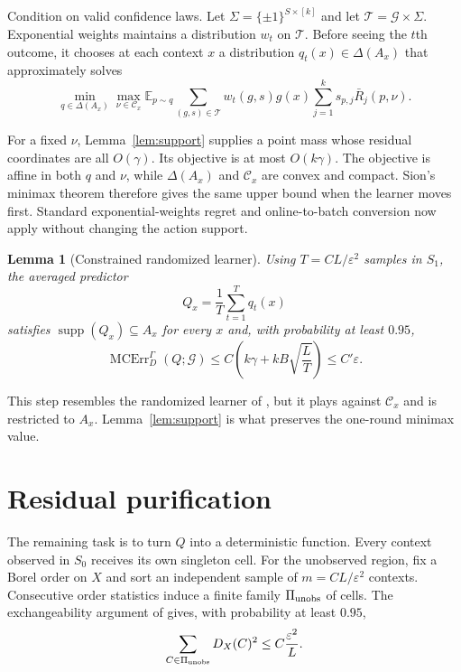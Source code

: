 \documentclass{article}
\newtheorem{lemma}[theorem]{Lemma}
\theoremstyle{definition}
\theoremstyle{remark}
\newcommand{\E}{\mathbb E}
\newcommand{\1}{\mathbf 1}
\newcommand{\cG}{\mathcal G}
\newcommand{\cC}{\mathcal C}
\newcommand{\simplex}{\Delta}
\newcommand{\MCE}{\operatorname{MCErr}}
\newcommand{\supp}{\operatorname{supp}}
\begin{document}
Condition on valid confidence laws. Let $\Sigma=\{\pm1\}^{S\times[k]}$ and let $\mathcal T=\cG\times\Sigma$. Exponential weights maintains a distribution $w_t$ on $\mathcal T$. Before seeing the $t$th outcome, it chooses at each context $x$ a distribution $q_t(x)\in\simplex(A_x)$ that approximately solves
\begin{equation}
\min_{q\in\simplex(A_x)}\max_{\nu\in\cC_x}
\E_{p\sim q}\sum_{(g,s)\in\mathcal T}w_t(g,s)g(x)\sum_{j=1}^k s_{p,j}\bar R_j(p,\nu).
\label{eq:minimax}
\end{equation}

For a fixed $\nu$, Lemma~\ref{lem:support} supplies a point mass whose residual coordinates are all $O(\gamma)$. Its objective is at most $O(k\gamma)$. The objective is affine in both $q$ and $\nu$, while $\simplex(A_x)$ and $\cC_x$ are convex and compact. Sion's minimax theorem \citep{sion1958minimax} therefore gives the same upper bound when the learner moves first. Standard exponential-weights regret and online-to-batch conversion now apply without changing the action support.

\begin{lemma}[Constrained randomized learner]\label{lem:randomized}
Using $T=CL/\varepsilon^2$ samples in $S_1$, the averaged predictor
\[
Q_x=\frac1T\sum_{t=1}^Tq_t(x)
\]
satisfies $\supp(Q_x)\subseteq A_x$ for every $x$ and, with probability at least $0.95$,
\begin{equation}
\MCE_D^\Gamma(Q;\cG)\le C\left(k\gamma+kB\sqrt{\frac{L}{T}}\right)\le C'\varepsilon.
\label{eq:randomizedbound}
\end{equation}
\end{lemma}

This step resembles the randomized learner of \citet{lu2026multilevel}, but it plays against $\cC_x$ and is restricted to $A_x$. Lemma~\ref{lem:support} is what preserves the one-round minimax value.

\section{Residual purification}

The remaining task is to turn $Q$ into a deterministic function. Every context observed in $S_0$ receives its own singleton cell. For the unobserved region, fix a Borel order on $X$ and sort an independent sample of $m=CL/\varepsilon^2$ contexts. Consecutive order statistics induce a finite family $\Pi_{\rm unobs}$ of cells. The exchangeability argument of \citet{noarovroth2026deterministic} gives, with probability at least $0.95$,
\begin{equation}
\sum_{C\in\Pi_{\rm unobs}}D_X(C)^2\le C\frac{\varepsilon^2}{L}.
\label{eq:cellbudget}
\end{equation}
\end{document}
